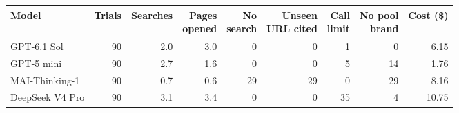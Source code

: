 \setlength{\tabcolsep}{4pt}
\begin{tabular}{@{}lrrrrrrrr@{}}
\toprule
Model & Trials & Searches & \shortstack[r]{Pages\\opened} & \shortstack[r]{No\\search} & \shortstack[r]{Unseen\\URL cited} & \shortstack[r]{Call\\limit} & \shortstack[r]{No pool\\brand} & Cost (\$) \\
\midrule
GPT-6.1 Sol & 90 & 2.0 & 3.0 & 0 & 0 & 1 & 0 & 6.15 \\
GPT-5 mini & 90 & 2.7 & 1.6 & 0 & 0 & 5 & 14 & 1.76 \\
MAI-Thinking-1 & 90 & 0.7 & 0.6 & 29 & 29 & 0 & 29 & 8.16 \\
DeepSeek V4 Pro & 90 & 3.1 & 3.4 & 0 & 0 & 35 & 4 & 10.75 \\
\bottomrule
\end{tabular}
